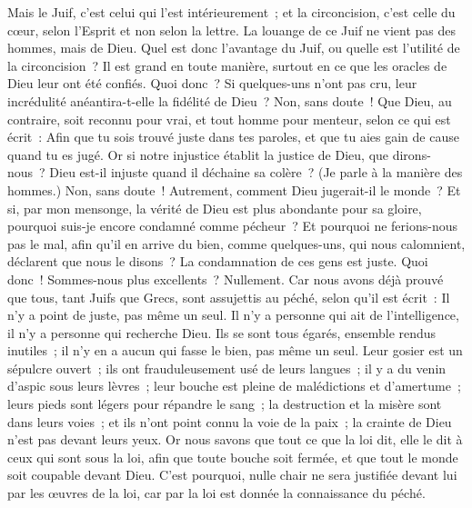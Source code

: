 \begin{multicols}{2}
Mais le Juif, c'est celui qui l'est intérieurement~; et la circoncision, c'est celle du cœur, selon l'Esprit et non selon la lettre. La louange de ce Juif ne vient pas des hommes, mais de Dieu.
\VerseOne{}Quel est donc l'avantage du Juif, ou quelle est l'utilité de la circoncision~?
Il est grand en toute manière, surtout en ce que les oracles de Dieu leur ont été confiés.
Quoi donc~? Si quelques-uns n'ont pas cru, leur incrédulité anéantira-t-elle la fidélité de Dieu~?
Non, sans doute~! Que Dieu, au contraire, soit reconnu pour vrai, et tout homme pour menteur, selon ce qui est écrit~: Afin que tu sois trouvé juste dans tes paroles, et que tu aies gain de cause quand tu es jugé.
Or si notre injustice établit la justice de Dieu, que dirons-nous~? Dieu est-il injuste quand il déchaine sa colère~? (Je parle à la manière des hommes.)
Non, sans doute~! Autrement, comment Dieu jugerait-il le monde~?
Et si, par mon mensonge, la vérité de Dieu est plus abondante pour sa gloire, pourquoi suis-je encore condamné comme pécheur~?
Et pourquoi ne ferions-nous pas le mal, afin qu'il en arrive du bien, comme quelques-uns, qui nous calomnient, déclarent que nous le disons~? La condamnation de ces gens est juste.
Quoi donc~! Sommes-nous plus excellents~? Nullement. Car nous avons déjà prouvé que tous, tant Juifs que Grecs, sont assujettis au péché,
selon qu'il est écrit~: Il n'y a point de juste, pas même un seul.
Il n'y a personne qui ait de l'intelligence, il n'y a personne qui recherche Dieu.
Ils se sont tous égarés, ensemble rendus inutiles~; il n'y en a aucun qui fasse le bien, pas même un seul.
Leur gosier est un sépulcre ouvert~; ils ont frauduleusement usé de leurs langues~; il y a du venin d'aspic sous leurs lèvres~;
leur bouche est pleine de malédictions et d'amertume~;
leurs pieds sont légers pour répandre le sang~;
la destruction et la misère sont dans leurs voies~;
et ils n'ont point connu la voie de la paix~;
la crainte de Dieu n'est pas devant leurs yeux.
Or nous savons que tout ce que la loi dit, elle le dit à ceux qui sont sous la loi, afin que toute bouche soit fermée, et que tout le monde soit coupable devant Dieu.
C'est pourquoi, nulle chair ne sera justifiée devant lui par les œuvres de la loi, car par la loi est donnée la connaissance du péché.

\end{multicols}
